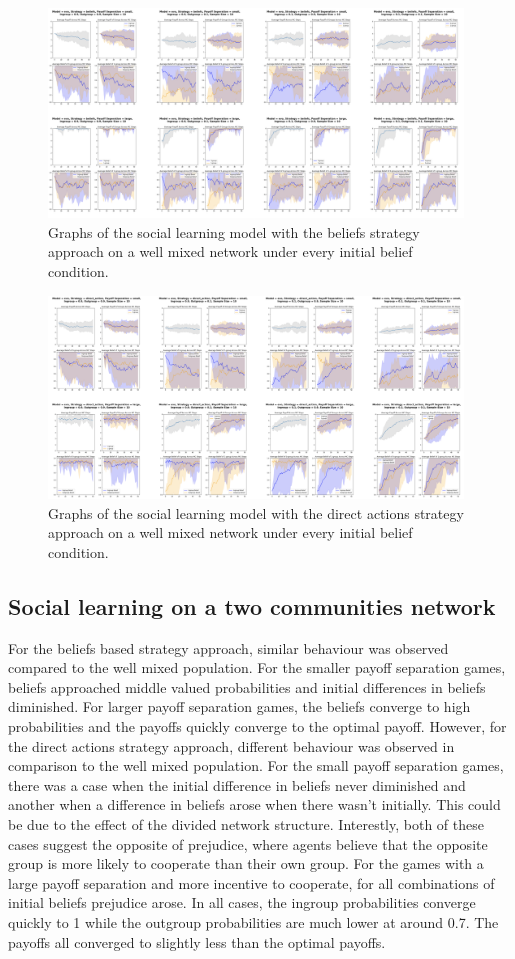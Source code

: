 \documentclass[]{llncs}
\begin{document}
\begin{figure}
\centering
\includegraphics[width=11cm]{images/social_wellmixed1}
\caption{\label{social_wellmixed1} Graphs of the social learning model with the beliefs strategy approach on a well mixed network under every initial belief condition.}
\end{figure}
\begin{figure}
\centering
\includegraphics[width=11cm]{images/social_wellmixed2}
\caption{\label{social_wellmixed2} Graphs of the social learning model with the direct actions strategy approach on a well mixed network under every initial belief condition.}
\end{figure}

\subsection{Social learning on a two communities network}
For the beliefs based strategy approach, similar behaviour was observed compared to the well mixed population. For the smaller payoff separation games, beliefs approached middle valued probabilities and initial differences in beliefs diminished. For larger payoff separation games, the beliefs converge to high probabilities and the payoffs quickly converge to the optimal payoff.
However, for the direct actions strategy approach, different behaviour was observed in comparison to the well mixed population. For the small payoff separation games, there was a case when the initial difference in beliefs never diminished and another when a difference in beliefs arose when there wasn’t initially. This could be due to the effect of the divided network structure. Interestly, both of these cases suggest the opposite of prejudice, where agents believe that the opposite group is more likely to cooperate than their own group.
For the games with a large payoff separation and more incentive to cooperate, for all combinations of initial beliefs prejudice arose. In all cases, the ingroup probabilities converge quickly to 1 while the outgroup probabilities are much lower at around 0.7. The payoffs all converged to slightly less than the optimal payoffs.
\end{document}
